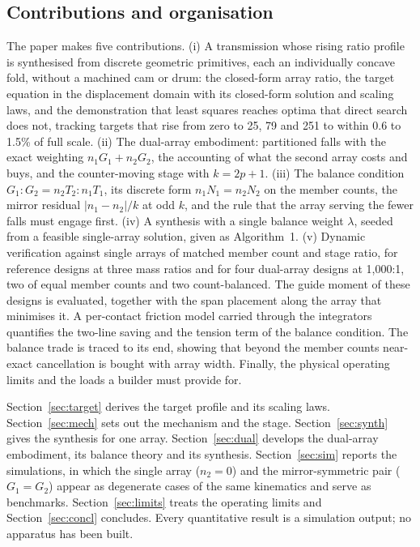 \documentclass[preprint,12pt,number]{elsarticle}
\begin{document}
\subsection{Contributions and organisation}

The paper makes five contributions. (i) A transmission whose rising ratio profile is synthesised from discrete geometric primitives, each an individually concave fold, without a machined cam or drum: the closed-form array ratio, the target equation in the displacement domain with its closed-form solution and scaling laws, and the demonstration that least squares reaches optima that direct search does not, tracking targets that rise from zero to 25, 79 and 251 to within 0.6 to 1.5\% of full scale. (ii) The dual-array embodiment: partitioned falls with the exact weighting $n_1 G_1 + n_2 G_2$, the accounting of what the second array costs and buys, and the counter-moving stage with $k = 2p+1$. (iii) The balance condition $G_1 : G_2 = n_2 T_2 : n_1 T_1$, its discrete form $n_1 N_1 = n_2 N_2$ on the member counts, the mirror residual $|n_1 - n_2|/k$ at odd $k$, and the rule that the array serving the fewer falls must engage first. (iv) A synthesis with a single balance weight $\lambda$, seeded from a feasible single-array solution, given as Algorithm~1. (v) Dynamic verification against single arrays of matched member count and stage ratio, for reference designs at three mass ratios and for four dual-array designs at 1,000:1, two of equal member counts and two count-balanced. The guide moment of these designs is evaluated, together with the span placement along the array that minimises it. A per-contact friction model carried through the integrators quantifies the two-line saving and the tension term of the balance condition. The balance trade is traced to its end, showing that beyond the member counts near-exact cancellation is bought with array width. Finally, the physical operating limits and the loads a builder must provide for.

Section~\ref{sec:target} derives the target profile and its scaling laws. Section~\ref{sec:mech} sets out the mechanism and the stage. Section~\ref{sec:synth} gives the synthesis for one array. Section~\ref{sec:dual} develops the dual-array embodiment, its balance theory and its synthesis. Section~\ref{sec:sim} reports the simulations, in which the single array ($n_2 = 0$) and the mirror-symmetric pair ($G_1 = G_2$) appear as degenerate cases of the same kinematics and serve as benchmarks. Section~\ref{sec:limits} treats the operating limits and Section~\ref{sec:concl} concludes. Every quantitative result is a simulation output; no apparatus has been built.
\end{document}
